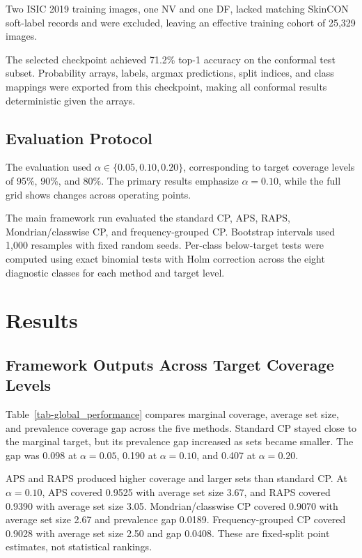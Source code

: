 ﻿\documentclass[preprint,12pt]{elsarticle}
\begin{document}
Two ISIC 2019 training images, one NV and one DF, lacked matching SkinCON soft-label records and were excluded, leaving an effective training cohort of 25,329 images.

The selected checkpoint achieved 71.2\% top-1 accuracy on the conformal test subset. Probability arrays, labels, argmax predictions, split indices, and class mappings were exported from this checkpoint, making all conformal results deterministic given the arrays.

\subsection{Evaluation Protocol}

The evaluation used $\alpha \in \{0.05,0.10,0.20\}$, corresponding to target coverage levels of 95\%, 90\%, and 80\%. The primary results emphasize $\alpha=0.10$, while the full grid shows changes across operating points.

The main framework run evaluated the standard CP, APS, RAPS, Mondrian/classwise CP, and frequency-grouped CP. Bootstrap intervals used 1,000 resamples with fixed random seeds. Per-class below-target tests were computed using exact binomial tests with Holm correction across the eight diagnostic classes for each method and target level.

\section{Results}
\label{sec-results}

\subsection{Framework Outputs Across Target Coverage Levels}

Table~\ref{tab-global_performance} compares marginal coverage, average set size, and prevalence coverage gap across the five methods. Standard CP stayed close to the marginal target, but its prevalence gap increased as sets became smaller. The gap was 0.098 at $\alpha=0.05$, 0.190 at $\alpha=0.10$, and 0.407 at $\alpha=0.20$.

APS and RAPS produced higher coverage and larger sets than standard CP. At $\alpha=0.10$, APS covered 0.9525 with average set size 3.67, and RAPS covered 0.9390 with average set size 3.05. Mondrian/classwise CP covered 0.9070 with average set size 2.67 and prevalence gap 0.0189. Frequency-grouped CP covered 0.9028 with average set size 2.50 and gap 0.0408. These are fixed-split point estimates, not statistical rankings.
\end{document}
